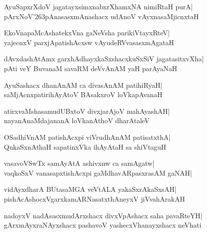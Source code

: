 \documentclass[twoside,12pt,openright]{book}
\def\S{\char'263}
\newcounter{shloka}[chapter]
\begin{document}
\begin{shloka}%
AyuSapxrXdoV jagatayxsimxnabxrXhamxNA nimiRtaH purA|\\
pArxNoV\S pAnasasxmAnashacx udAnoV vAyxnasaMjicnxtaH
\end{shloka}

\begin{shloka}%
EkoVnapaMcAshatekxVna gaNeVsha parikiVtayxRteV|\\
yajecnxV parxjApatishAcxsw vAyudeRVvasasxmAgataH
\end{shloka}

\begin{shloka}%
dAvxdashAtAmx garxhAdhayxkaSxshacxkuSxSiV jagatasitxvXha|\\
pAti veY BuvanaM savaRM deVvAnAM yaH parAyaNaH
\end{shloka}


\begin{shloka}%
AyuSashacx dhanAnAM ca divasAnAM patihiRyaH|\\
saMjAcnxpatirihAyAtoV BAsakxroV loVkapAvanaH
\end{shloka}

\begin{shloka}%
atirxvaMshasamudUBxtoV divxjarAjoV mahAyashAH|\\
nayanAnaMdajananA loVkanAthoV dharAtaleV
\end{shloka}

\begin{shloka}%
OSadhiVnAM patishAcxpi viVrudhAnAM patisatxthA|\\
QukaSxnAthaH sapatinxVka ihAyAtaH sa shiVtaguH
\end{shloka}

\begin{shloka}%
vasavoVSwTx samAyAtA ashivxnw ca samAgatw|\\
vaqkoSxV vanasapxtishAcxpi gaMdhavARpasxrasAM gaNAH|\\
\end{shloka}

\begin{shloka}%
vidAyxdharA BUtasaMGA veVtALA yakaSxrAkaSxsAH|\\
pishAcAshocxVgarxkamARNasatxthAneyxV jiVvahArakAH
\end{shloka}

\begin{shloka}%
nadoyxV nadAsasxmudArxshacx divxVpAshacx saha pavaRteYH|\\
gArxmAyxraNAyxshacx pashavoV yashecxVhanayxshacx neVhati
\end{shloka}
\end{document}
